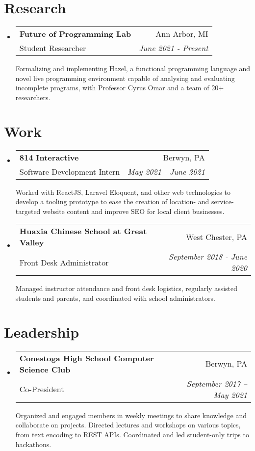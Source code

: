 \documentclass[letterpaper,11pt]{article}
\makeatletter
\newcommand{\resumeSubheading}[4]{
  \vspace{-3pt}\item
    \begin{tabular*}{0.97\textwidth}[t]{l@{\extracolsep{\fill}}r}
      \textbf{#1} & #2 \\
      {#3} & \textit{\small #4} \\[3pt]
    \end{tabular*}\vspace{-5pt}
}
\newcommand{\resumeSubheadingDescription}[1]{
  \parbox{0.97\textwidth}{#1}
}
\newenvironment{resumeSubHeadingList}{
  \begin{itemize}[leftmargin=*, label={}]
}{
  \end{itemize}
}
\makeatother
\begin{document}
  \vspace*{0pt}
\section{Research}
  \begin{resumeSubHeadingList}
    \resumeSubheading%
      {Future of Programming Lab}%
      {Ann Arbor, MI}%
      {Student Researcher}%
      {June 2021 - Present}

      \resumeSubheadingDescription{
        Formalizing and implementing Hazel, a functional programming language and novel live
        programming environment capable of analysing and evaluating incomplete programs, with
        Professor Cyrus Omar and a team of 20+ researchers.
      }
  \end{resumeSubHeadingList}
\section{Work}
  \begin{resumeSubHeadingList}
    \resumeSubheading%
      {814 Interactive}%
      {Berwyn, PA}%
      {Software Development Intern}%
      {May 2021 - June 2021}

      \resumeSubheadingDescription{
        Worked with ReactJS, Laravel Eloquent, and other web technologies to develop a tooling
        prototype to ease the creation of location- and service-targeted website content and improve
        SEO for local client businesses.
      }

    \resumeSubheading%
      {Huaxia Chinese School at Great Valley}%
      {West Chester, PA}%
      {Front Desk Administrator}%
      {September 2018 - June 2020}

      \resumeSubheadingDescription{
        Managed instructor attendance and front desk logistics, regularly assisted students and
        parents, and coordinated with school administrators.
      }
  \end{resumeSubHeadingList}
\section{Leadership}
  \begin{resumeSubHeadingList}

    \resumeSubheading%
      {Conestoga High School Computer Science Club}%
      {Berwyn, PA}%
      {Co-President}%
      {September 2017 -- May 2021}

      \resumeSubheadingDescription{
        Organized and engaged members in weekly meetings to share knowledge and collaborate on
        projects. Directed lectures and workshops on various topics, from text encoding to
        REST APIs. Coordinated and led student-only trips to hackathons.
      }
  \end{resumeSubHeadingList}
\vspace*{-9pt}
\end{document}
